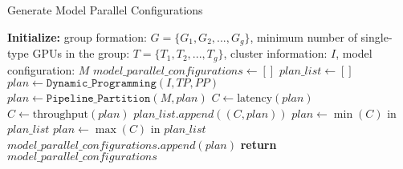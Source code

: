 \begin{algorithm}[!t]
\caption{Generate Model Parallel Configurations}
\small
\label{alg:genmodelparallel}
\begin{algorithmic}[1]
\STATE \textbf{Initialize:} group formation: $G = \{G_1, G_2, ..., G_g\}$, minimum number of single-type GPUs in the group: $T = \{T_1, T_2, ..., T_g\}$, cluster information: $I$, model configuration: $M$ 
\STATE $model\_parallel\_configurations \leftarrow []$
\STATE $plan\_list \leftarrow []$
\STATE{\textcolor{gray}{/* Limit TP within Single-type GPUs */}}
            \STATE{\textcolor{gray}{/* Route Pipeline Communication */}}
            \STATE $plan \gets \texttt{Dynamic\_Programming}(I,TP,PP)$
            \STATE{\textcolor{gray}{/* Generate Pipeline Partition */}}
            \STATE $plan \gets \texttt{Pipeline\_Partition}(M, plan)$
                \STATE $C \leftarrow \text{latency}(plan)$
            \ELSE
                \STATE $C \leftarrow \text{throughput}(plan)$
            \ENDIF
            \STATE $plan\_list.append((C, plan))$
        \ENDFOR
    \ENDFOR
        \STATE{\textcolor{gray}{/* Select Latency Optimal Plan */}}
        \STATE $plan \leftarrow \min(C)$ in $plan\_list$
    \ELSE
        \STATE{\textcolor{gray}{/* Select Throughput Optimal Plan */}}
        \STATE $plan \leftarrow \max(C)$ in $plan\_list$
    \ENDIF
    \STATE $model\_parallel\_configurations.append(plan)$
\ENDFOR
\STATE \textbf{return} $model\_parallel\_configurations$
\end{algorithmic}
\end{algorithm}
